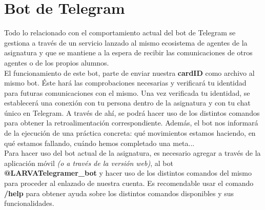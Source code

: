 \section{Bot de Telegram}

Todo lo relacionado con el comportamiento actual del bot de Telegram se gestiona a través de un servicio lanzado al mismo ecosistema de agentes de la asignatura y que se mantiene a la espera de recibir las comunicaciones de otros agentes o de los propios alumnos.\\

El funcionamiento de este bot, parte de enviar nuestra \textbf{cardID} como archivo al mismo bot. Éste hará las comprobaciones necesarias y verificará tu identidad para futuras comunicaciones con el mismo. Una vez verificada tu identidad, se establecerá una conexión con tu persona dentro de la asignatura y con tu chat único en Telegram. A través de ahí, se podrá hacer uso de los distintos comandos para obtener la retroalimentación correspondiente. Además, el bot nos informará de la ejecución de una práctica concreta: qué movimientos estamos haciendo, en qué estamos fallando, cuándo hemos completado una meta...\\

Para hacer uso del bot actual de la asignatura, es necesario agregar a través de la aplicación móvil \textit{(o a través de la versión web)}, al bot \textbf{@LARVATelegramer\_bot} y hacer uso de los distintos comandos del mismo para proceder al enlazado de nuestra cuenta. Es recomendable usar el comando \textbf{/help} para obtener ayuda sobre los distintos comandos disponibles y sus funcionalidades.